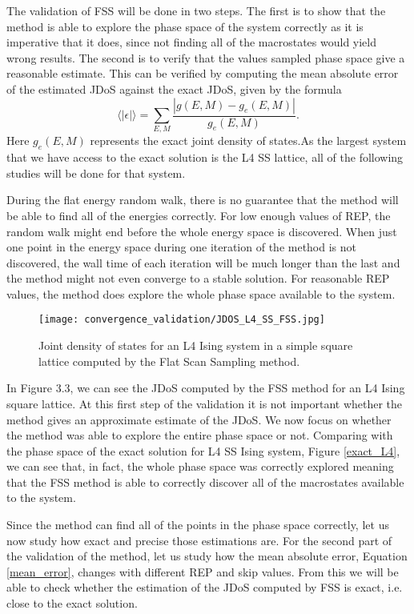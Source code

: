 	The validation of FSS will be done in two steps. The first is to show that the method is able to explore the phase space of the system correctly as it is imperative that it does, since not finding all of the macrostates would yield wrong results. The second is to verify that the values sampled phase space give a reasonable estimate. This can be verified by computing the mean absolute error of the estimated JDoS against the exact JDoS, given by the formula
\begin{equation}\label{mean_error}
	  \langle |\epsilon|\rangle = \sum_{E, M} \frac{|g(E, M) - g_e(E, M)|}{g_e(E, M)}.
\end{equation} 
Here $g_e(E, M)$ represents the exact joint density of states.As the largest system that we have access to the exact solution is the L4 SS lattice, all of the following studies will be done for that system.

	During the flat energy random walk, there is no guarantee that the method will  be able to find all of the energies correctly. For low enough values of REP, the random walk might end before the whole energy space is discovered. When just one point in the energy space during one iteration of the method is not discovered, the wall time of each iteration will be much longer than the last and the method might not even converge to a stable solution. For reasonable REP values, the method does explore the whole phase space available to the system.
\begin{figure}[h]
	\centering
	\label{jdos_est}
	\texttt{[image: convergence\_validation/JDOS\_L4\_SS\_FSS.jpg]}
	\caption{Joint density of states for an L4 Ising system in a simple square lattice computed by the Flat Scan Sampling method. }
\end{figure}	

\pagebreak
	
	In Figure 3.3, we can see the JDoS computed by the FSS method for an L4 Ising square lattice. At this first step of the validation it is not important whether the method gives an approximate estimate of the JDoS. We now focus on whether the method was able to explore the entire phase space or not. 
Comparing with the phase space of the exact solution for L4 SS Ising system, Figure \ref{exact_L4}, we can see that, in fact, the whole phase space was correctly explored meaning that the FSS method is able to correctly discover all of the macrostates available to the system. 

	Since the method can find all of the points in the phase space correctly, let us now study how exact and precise those estimations are. For the second part of the validation of the method, let us study how the mean absolute error, Equation \ref{mean_error}, changes with different REP and skip values. From this we will be able to check whether the estimation of the JDoS computed by FSS is exact, i.e. close to the exact solution.

